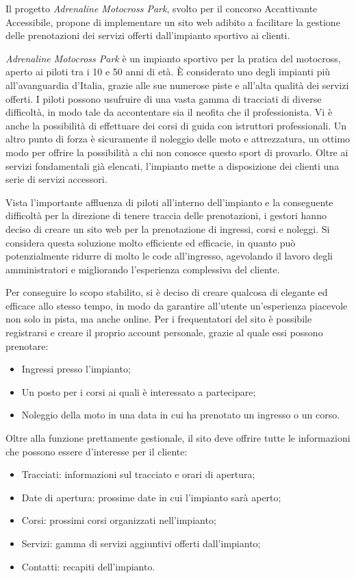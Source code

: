 Il progetto \textit{Adrenaline Motocross Park}, svolto per il concorso Accattivante Accessibile, propone di implementare un sito web adibito a facilitare la gestione delle prenotazioni dei servizi offerti dall'impianto sportivo ai clienti.

\textit{Adrenaline Motocross Park} è un impianto sportivo per la pratica del motocross, aperto ai piloti tra i 10 e 50 anni di età. È considerato uno degli impianti più all'avanguardia d'Italia, grazie alle sue numerose piste e all'alta qualità dei servizi offerti. I piloti possono usufruire di una vasta gamma di tracciati di diverse difficoltà, in modo tale da accontentare sia il neofita che il professionista. Vi è anche la possibilità di effettuare dei corsi di guida con istruttori professionali. Un altro punto di forza è sicuramente il noleggio delle moto e attrezzatura, un ottimo modo per offrire la possibilità a chi non conosce questo sport di provarlo. Oltre ai servizi fondamentali già elencati, l'impianto mette a disposizione dei clienti una serie di servizi accessori.

Vista l'importante affluenza di piloti all'interno dell'impianto e la conseguente difficoltà per la direzione di tenere traccia delle prenotazioni, i gestori hanno deciso di creare un sito web per la prenotazione di ingressi, corsi e noleggi. Si considera questa soluzione molto efficiente ed efficacie, in quanto può potenzialmente ridurre di molto le code all'ingresso, agevolando il lavoro degli amministratori e migliorando l'esperienza complessiva del cliente.

Per conseguire lo scopo stabilito, si è deciso di creare qualcosa di elegante ed efficace allo stesso tempo, in modo da garantire all'utente un'esperienza piacevole non solo in pista, ma anche online. Per i frequentatori del sito è possibile registrarsi e creare il proprio account personale, grazie al quale essi possono prenotare:
\begin{itemize}
\item Ingressi presso l'impianto;
\item Un posto per i corsi ai quali è interessato a partecipare;
\item Noleggio della moto in una data in cui ha prenotato un ingresso o un corso.
\end{itemize}

Oltre alla funzione prettamente gestionale, il sito deve offrire tutte le informazioni che possono essere d'interesse per il cliente:
\begin{itemize}
\item Tracciati: informazioni sul tracciato e orari di apertura;
\item Date di apertura: prossime date in cui l'impianto sarà aperto;
\item Corsi: prossimi corsi organizzati nell'impianto;
\item Servizi: gamma di servizi aggiuntivi offerti dall'impianto;
\item Contatti: recapiti dell'impianto.
\end{itemize}